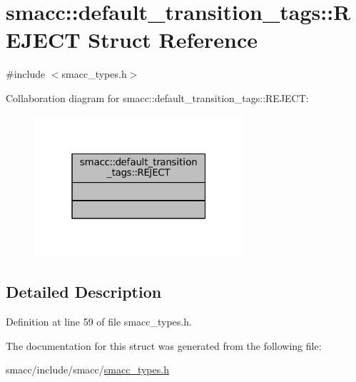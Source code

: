 \hypertarget{structsmacc_1_1default__transition__tags_1_1REJECT}{}\section{smacc\+:\+:default\+\_\+transition\+\_\+tags\+:\+:R\+E\+J\+E\+CT Struct Reference}
\label{structsmacc_1_1default__transition__tags_1_1REJECT}


{\ttfamily \#include $<$smacc\+\_\+types.\+h$>$}



Collaboration diagram for smacc\+:\+:default\+\_\+transition\+\_\+tags\+:\+:R\+E\+J\+E\+CT\+:
\nopagebreak
\begin{figure}[H]
\begin{center}
\leavevmode
\includegraphics[width=220pt]{structsmacc_1_1default__transition__tags_1_1REJECT__coll__graph}
\end{center}
\end{figure}


\subsection{Detailed Description}


Definition at line 59 of file smacc\+\_\+types.\+h.



The documentation for this struct was generated from the following file\+:\begin{DoxyCompactItemize}
\item 
smacc/include/smacc/\hyperlink{smacc__types_8h}{smacc\+\_\+types.\+h}\end{DoxyCompactItemize}
